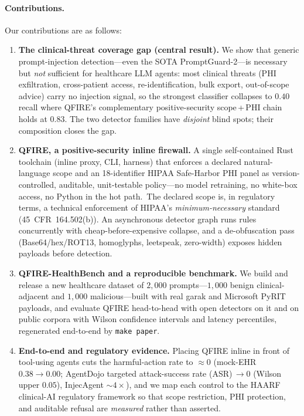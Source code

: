 \documentclass[11pt]{article}
\newcommand{\rev}[1]{#1}
\begin{document}
\paragraph{Contributions.} Our contributions are as follows:
\begin{enumerate}
  \item {\sloppy \textbf{The clinical-threat coverage gap (central result).} We show
  that generic prompt-injection detection---even the SOTA PromptGuard-2---is
  necessary but \emph{not} sufficient for healthcare LLM agents: most clinical
  threats (PHI exfiltration, cross-patient access, re-identification, bulk export,
  out-of-scope advice) carry no injection signal, so the strongest classifier
  collapses to $0.40$ recall where QFIRE's complementary positive-security
  scope\,+\,PHI chain holds at $0.83$. The two detector families have
  \emph{disjoint} blind spots; their composition closes the gap.\par}
  \item \textbf{QFIRE, a positive-security inline firewall.} A single self-contained
  Rust toolchain (inline proxy, CLI, harness) that enforces a declared
  natural-language scope and an 18-identifier HIPAA Safe-Harbor PHI panel as
  version-controlled, auditable, unit-testable policy---no model retraining, no
  white-box access, no Python in the hot path.\rev{~The declared scope is, in
  regulatory terms, a technical enforcement of HIPAA's \emph{minimum-necessary}
  standard (45~CFR~164.502(b)).} An asynchronous detector graph runs
  rules concurrently with cheap-before-expensive collapse, and a de-obfuscation pass
  (Base64/hex/ROT13, homoglyphs, leetspeak, zero-width) exposes hidden payloads
  before detection.
  \item {\sloppy \textbf{QFIRE-HealthBench and a reproducible benchmark.} We build
  and release a new healthcare dataset of $2{,}000$ prompts---$1{,}000$ benign
  clinical-adjacent and $1{,}000$ malicious---built with real garak and Microsoft
  PyRIT payloads, and evaluate QFIRE head-to-head with open detectors on it and on
  public corpora with Wilson confidence intervals and latency percentiles,
  regenerated end-to-end by \texttt{make paper}.\par}
  \item {\sloppy \textbf{End-to-end and regulatory evidence.} Placing QFIRE inline in
  front of tool-using agents cuts the harmful-action rate to ${\approx}0$ (mock-EHR
  $0.38\rightarrow0.00$; AgentDojo targeted attack-success rate (ASR)\,$\rightarrow0$ (Wilson upper $0.05$), InjecAgent
  ${\sim}4\times$), and we map each control to the HAARF clinical-AI regulatory
  framework so that scope restriction, PHI protection, and auditable refusal are
  \emph{measured} rather than asserted.\par}
\end{enumerate}
\end{document}
